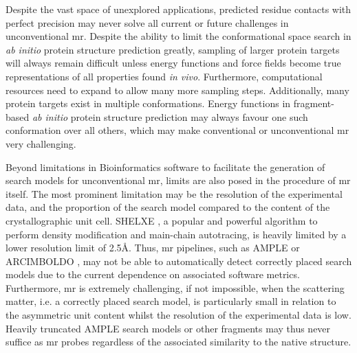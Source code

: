 Despite the vast space of unexplored applications, predicted residue contacts with perfect precision may never solve all current or future challenges in unconventional \gls{mr}. Despite the ability to limit the conformational space search in \textit{ab initio} protein structure prediction greatly, sampling of larger protein targets will always remain difficult unless energy functions and force fields become true representations of all properties found \textit{in vivo}. Furthermore, computational resources need to expand to allow many more sampling steps. Additionally, many protein targets exist in multiple conformations. Energy functions in fragment-based \textit{ab initio} protein structure prediction may always favour one such conformation over all others, which may make conventional or unconventional \gls{mr} very challenging. 

Beyond limitations in Bioinformatics software to facilitate the generation of search models for unconventional \gls{mr}, limits are also posed in the procedure of \gls{mr} itself. The most prominent limitation may be the resolution of the experimental data, and the proportion of the search model compared to the content of the crystallographic unit cell. SHELXE \cite{Thorn2013-le}, a popular and powerful algorithm to perform density modification and main-chain autotracing, is heavily limited by a lower resolution limit of 2.5\AA. Thus, \gls{mr} pipelines, such as AMPLE \cite{Bibby2012-lm} or ARCIMBOLDO \cite{Sammito2015-dv}, may not be able to automatically detect correctly placed search models due to the current dependence on associated software metrics. Furthermore, \gls{mr} is extremely challenging, if not impossible, when the scattering matter, i.e. a correctly placed search model, is particularly small in relation to the asymmetric unit content whilst the resolution of the experimental data is low. Heavily truncated AMPLE search models or other fragments may thus never suffice as \gls{mr} probes regardless of the associated similarity to the native structure.

